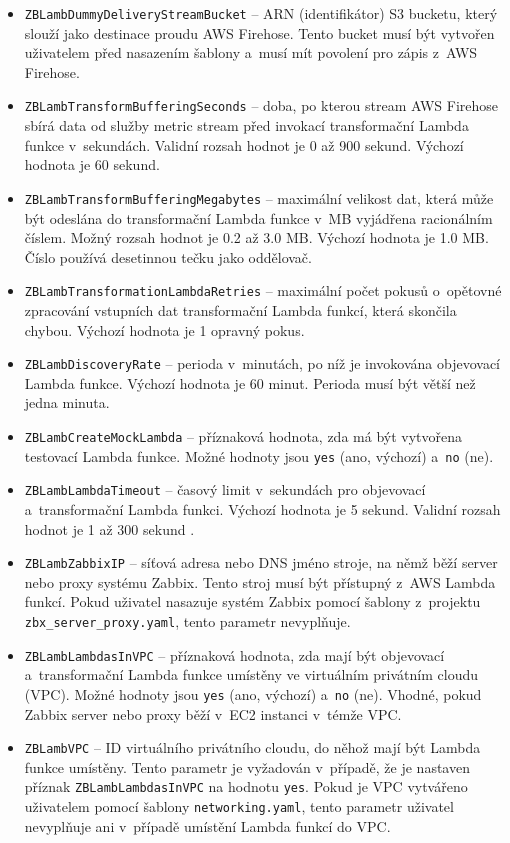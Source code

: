 \documentclass[czech, ing, kiv, he, iso690]{fasthesis}
\begin{document}
\begin{itemize}
    \item \verb|ZBLambDummyDeliveryStreamBucket| -- ARN (identifikátor) S3 bucketu, který slouží jako destinace proudu AWS Firehose. Tento bucket musí být vytvořen uživatelem před nasazením šablony a~musí mít povolení pro zápis z~AWS Firehose.
    \item \verb|ZBLambTransformBufferingSeconds| -- doba, po kterou stream AWS Firehose sbírá data od služby metric stream před invokací transformační Lambda funkce v~sekundách. Validní rozsah hodnot je 0 až 900 sekund. Výchozí hodnota je 60 sekund.
    \item \verb|ZBLambTransformBufferingMegabytes| -- maximální velikost dat, která může být odeslána do transformační Lambda funkce v~MB vyjádřena racionálním číslem. Možný rozsah hodnot je 0.2 až 3.0 MB. Výchozí hodnota je 1.0 MB. Číslo používá desetinnou tečku jako oddělovač.
    \item \verb|ZBLambTransformationLambdaRetries| -- maximální počet pokusů o~opětovné zpracování vstupních dat transformační Lambda funkcí, která skončila chybou. Výchozí hodnota je 1 opravný pokus.
    \item \verb|ZBLambDiscoveryRate| -- perioda v~minutách, po níž je invokována objevovací Lambda funkce. Výchozí hodnota je 60 minut. Perioda musí být větší než jedna minuta.
    \item \verb|ZBLambCreateMockLambda| -- příznaková hodnota, zda má být vytvořena testovací Lambda funkce. Možné hodnoty jsou \verb|yes| (ano, výchozí) a~\verb|no| (ne).
    \item \verb|ZBLambLambdaTimeout| -- časový limit v~sekundách pro objevovací a~transformační Lambda funkci. Výchozí hodnota je 5 sekund. Validní rozsah hodnot je 1 až 300 sekund \cite{firehose.docs.aws}.
    \item \verb|ZBLambZabbixIP| -- síťová adresa nebo DNS jméno stroje, na němž běží server nebo proxy systému Zabbix. Tento stroj musí být přístupný z~AWS Lambda funkcí. Pokud uživatel nasazuje systém Zabbix pomocí šablony z~projektu \verb|zbx_server_proxy.yaml|, tento parametr nevyplňuje.
    \item \verb|ZBLambLambdasInVPC| -- příznaková hodnota, zda mají být objevovací a~transformační Lambda funkce umístěny ve virtuálním privátním cloudu (VPC). Možné hodnoty jsou \verb|yes| (ano, výchozí) a~\verb|no| (ne). Vhodné, pokud Zabbix server nebo proxy běží v~EC2 instanci v~témže VPC.
    \item \verb|ZBLambVPC| -- ID virtuálního privátního cloudu, do něhož mají být Lambda funkce umístěny. Tento parametr je vyžadován v~případě, že je nastaven příznak \verb|ZBLambLambdasInVPC| na hodnotu \verb|yes|. Pokud je VPC vytvářeno uživatelem pomocí šablony \verb|networking.yaml|, tento parametr uživatel nevyplňuje ani v~případě umístění Lambda funkcí do VPC.

\end{itemize}
\end{document}
